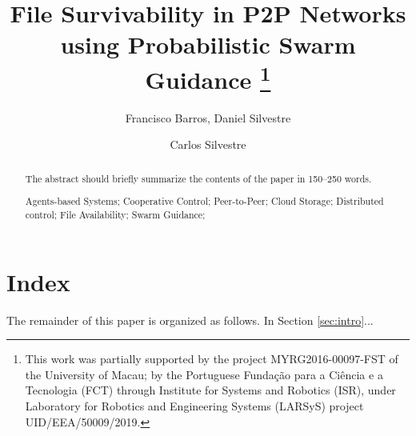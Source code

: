 \documentclass[runningheads]{llncs}
\begin{document}
\title {File Survivability in P2P Networks using Probabilistic Swarm Guidance
\thanks{This work was partially supported by the project MYRG2016-00097-FST of the University of Macau; by the Portuguese Fundação para a Ciência e a Tecnologia (FCT) through Institute for Systems and Robotics (ISR), under Laboratory for Robotics and Engineering Systems (LARSyS) project UID/EEA/50009/2019.}
}
\author{Francisco Barros, Daniel Silvestre \and Carlos Silvestre}
\maketitle
\begin{abstract}
The abstract should briefly summarize the contents of the paper in 150--250 words.
\begin{keywords}Agents-based Systems; Cooperative Control; Peer-to-Peer; Cloud Storage; Distributed control; File Availability; Swarm Guidance;\end{keywords}
\end{abstract}

\section{Index}\label{sec:index}
The remainder of this paper is organized as follows. In Section \ref{sec:intro}...

\end{document}
